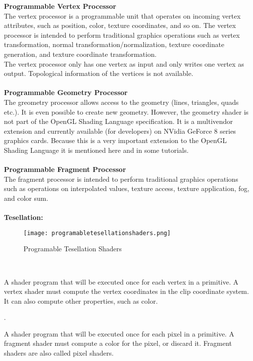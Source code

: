 \documentclass[onecolumn]{article}
\begin{document}
\textbf{Programmable Vertex Processor}\\
The vertex processor is a programmable unit that operates on incoming vertex attributes, such as position, color, texture coordinates, and so on. The vertex processor is intended to perform traditional graphics operations such as vertex transformation, normal transformation/normalization, texture coordinate generation, and texture coordinate transformation.\\
The vertex processor only has one vertex as input and only writes one vertex as output. Topological information of the vertices is not available.\\\\
\textbf{Programmable Geometry Processor}\\
The greometry processor allows access to the geometry (lines, triangles, quads etc.). It is even possible to create new geometry. However, the geometry shader is not part of the OpenGL Shading Language specification. It is a multivendor extension and currently available (for developers) on NVidia GeForce 8 series graphics cards. Because this is a very important extension to the OpenGL Shading Language it is mentioned here and in some tutorials.\\\\
\textbf{Programmable Fragment Processor}\\
The fragment processor is intended to perform traditional graphics operations such as operations on interpolated values, texture access, texture application, fog, and color sum.\\\\
\textbf{Tesellation:}
\begin{figure}[ht!]
\centering
\texttt{[image: programabletesellationshaders.png]}
\caption{Programable Tesellation Shaders \label{}}
\end{figure}
\\
\begin{story}
A shader program that will be executed once for each vertex in a primitive. A vertex shader must compute the vertex coordinates in the clip coordinate system. It can also compute other properties, such as color.
\end{story}
.\\

\begin{story}
A shader program that will be executed once for each pixel in a primitive. A fragment shader must compute a color for the pixel, or discard it. Fragment shaders are also called pixel shaders.
\end{story}
\end{document}
